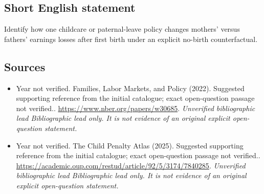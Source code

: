 \documentclass[11pt]{article}
\begin{document}
\subsection{Short English statement}
Identify how one childcare or paternal-leave policy changes mothers’ versus fathers’ earnings losses after first birth under an explicit no-birth counterfactual.

\subsection{Sources}
\begin{itemize}\raggedright
\item[\textnormal{[S1]}]\hypertarget{source:30007739:1}{} Year not verified. Families, Labor Markets, and Policy (2022). Suggested supporting reference from the initial catalogue; exact open-question passage not verified..
\url{https://www.nber.org/papers/w30685}.
{\small\textit{Unverified bibliographic lead Bibliographic lead only. It is not evidence of an original explicit open-question statement.}}

\item[\textnormal{[S2]}]\hypertarget{source:30007739:2}{} Year not verified. The Child Penalty Atlas (2025). Suggested supporting reference from the initial catalogue; exact open-question passage not verified..
\url{https://academic.oup.com/restud/article/92/5/3174/7840285}.
{\small\textit{Unverified bibliographic lead Bibliographic lead only. It is not evidence of an original explicit open-question statement.}}
\end{itemize}
\end{document}
